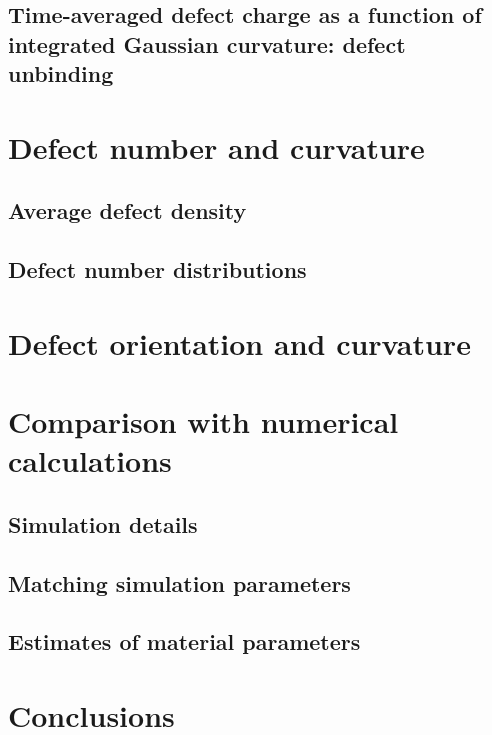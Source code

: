 \subsection{Time-averaged defect charge as a function of integrated Gaussian curvature: defect unbinding}

\section{Defect number and curvature}
\subsection{Average defect density}
\subsection{Defect number distributions}

\section{Defect orientation and curvature}

\section{Comparison with numerical calculations}
\subsection{Simulation details}
\subsection{Matching simulation parameters}
\subsection{Estimates of material parameters}

\section{Conclusions}
